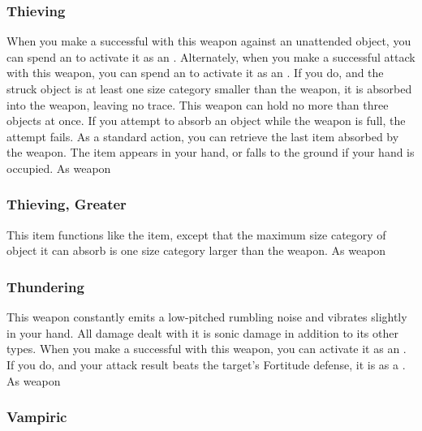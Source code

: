\hypertarget{item:Thieving}{\subsubsection{Thieving\hfill{}}}
When you make a successful  with this weapon against an unattended object, you can spend an  to activate it as an .
Alternately, when you make a successful  attack with this weapon, you can spend an  to activate it as an .
If you do, and the struck object is at least one size category smaller than the weapon, it is absorbed into the weapon, leaving no trace.
This weapon can hold no more than three objects at once.
If you attempt to absorb an object while the weapon is full, the attempt fails.
As a standard action, you can retrieve the last item absorbed by the weapon.
The item appears in your hand, or falls to the ground if your hand is occupied.
 
 As weapon
\lowercase{\hypertarget{item:Thieving, Greater}{}}\label{item:Thieving, Greater}
\hypertarget{item:Thieving, Greater}{\subsubsection{Thieving, Greater\hfill{}}}
This item functions like the  item, except that the maximum size category of object it can absorb is one size category larger than the weapon.
 
 As weapon
\lowercase{\hypertarget{item:Thundering}{}}\label{item:Thundering}
\hypertarget{item:Thundering}{\subsubsection{Thundering\hfill{}}}
This weapon constantly emits a low-pitched rumbling noise and vibrates slightly in your hand.
All damage dealt with it is sonic damage in addition to its other types.
When you make a successful  with this weapon, you can activate it as an .
If you do, and your attack result beats the target's Fortitude defense, it is \deafened as a .
 
 As weapon
\lowercase{\hypertarget{item:Vampiric}{}}\label{item:Vampiric}
\hypertarget{item:Vampiric}{\subsubsection{Vampiric\hfill{}}}
